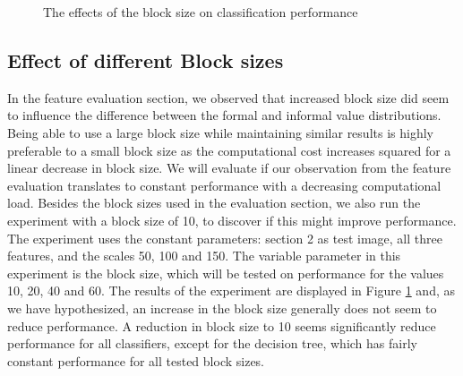 \datatwo

\begin{figure}[]
	\caption{The effects of the block size on classification performance}
	\label{fig:res_bar_2}
\end{figure}

\subsection{Effect of different Block sizes}
In the feature evaluation section, we observed that increased block size did seem to influence the difference between the formal and informal value distributions. Being able to use a large block size while maintaining similar results is highly preferable to a small block size as the computational cost increases squared for a linear decrease in block size. We will evaluate if our observation from the feature evaluation translates to constant performance with a decreasing computational load. Besides the block sizes used in the evaluation section, we also run the experiment with a block size of 10, to discover if this might improve performance. The experiment uses the constant parameters: section 2 as test image, all three features, and the scales 50, 100 and 150. The variable parameter in this experiment is the block size, which will be tested on performance for the values 10, 20, 40 and 60. The results of the experiment are displayed in Figure \ref{fig:res_bar_2} and, as we have hypothesized, an increase in the block size generally does not seem to reduce performance. A reduction in block size to 10 seems significantly reduce performance for all classifiers, except for the decision tree, which has fairly constant performance for all tested block sizes.



